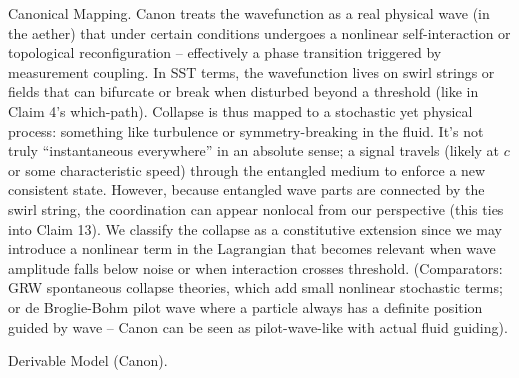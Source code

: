 \documentclass[11pt]{article}
\begin{document}
Canonical Mapping. Canon treats the wavefunction as a real physical wave (in the aether) that under certain conditions undergoes a nonlinear self-interaction or topological reconfiguration – effectively a phase transition triggered by measurement coupling. In SST terms, the wavefunction lives on swirl strings or fields that can bifurcate or break when disturbed beyond a threshold (like in Claim 4’s which-path). Collapse is thus mapped to a stochastic yet physical process: something like turbulence or symmetry-breaking in the fluid. It's not truly “instantaneous everywhere” in an absolute sense; a signal travels (likely at $c$ or some characteristic speed) through the entangled medium to enforce a new consistent state. However, because entangled wave parts are connected by the swirl string, the coordination can appear nonlocal from our perspective (this ties into Claim 13). We classify the collapse as a constitutive extension since we may introduce a nonlinear term in the Lagrangian that becomes relevant when wave amplitude falls below noise or when interaction crosses threshold. (Comparators: GRW spontaneous collapse theories, which add small nonlinear stochastic terms; or de Broglie-Bohm pilot wave where a particle always has a definite position guided by wave – Canon can be seen as pilot-wave-like with actual fluid guiding).


Derivable Model (Canon).
\end{document}
